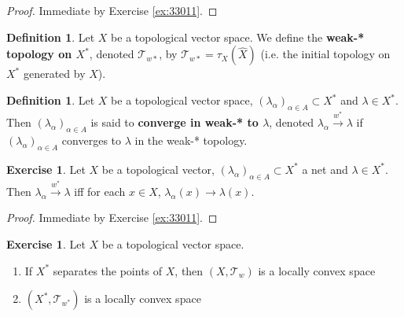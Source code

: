 \documentclass[12pt]{amsart}
\theoremstyle{definition}
\newtheorem{defn}[definition]{Definition}
\newtheorem{ex}[definition]{Exercise}
\newcommand{\al}{\alpha}
\newcommand{\lam}{\lambda}
\newcommand{\MT}{\mathcal{T}}
\newcommand{\conv}[1]{\xrightarrow{#1}}
\newcommand{\lex}[1]{\label{ex:#1}}
\newcommand{\rex}[1]{Exercise \ref{ex:#1}}
\begin{document}
	\begin{proof}
		Immediate by \rex{33011}.
	\end{proof}
	
	\begin{defn}
		Let $X$ be a topological vector space. We define the \textbf{weak-* topology on $X^*$}, denoted $\MT_{w*}$, by $\MT_{w*} = \tau_X(\hat{X})$ (i.e. the initial topology on $X^*$ generated by $\hat{X}$). 
	\end{defn}
	
	\begin{defn}
		Let $X$ be a topological vector space, $(\lam_{\al})_{\al \in A} \subset X^*$ and $\lam \in X^*$. Then $(\lam_{\al})_{\al \in A}$ is said to \textbf{converge in weak-* to $\lam$}, denoted $\lam_{\al} \conv{w^*} \lam$ if $(\lam_{\al})_{\al \in A}$ converges to $\lam$ in the weak-* topology.
	\end{defn}
	
	\begin{ex} \lex{}
		Let $X$ be a topological vector, $(\lam_{\al})_{\al \in A} \subset X^*$ a net and $\lam \in X^*$. Then $\lam_{\al} \conv{w^*} \lam$ iff for each $x \in X$, $ \lam_{\al} (x) \rightarrow \lam(x)$. 
	\end{ex}
	
	\begin{proof}
		Immediate by \rex{33011}.
	\end{proof}
	
	\begin{ex}
		Let $X$ be a topological vector space. 
		\begin{enumerate}
			\item If $X^*$ separates the points of $X$, then  $(X, \MT_w)$ is a locally convex space 
			\item $(X^*, \MT_{w^*})$ is a locally convex space 
		\end{enumerate}
	\end{ex}
	
\end{document}
